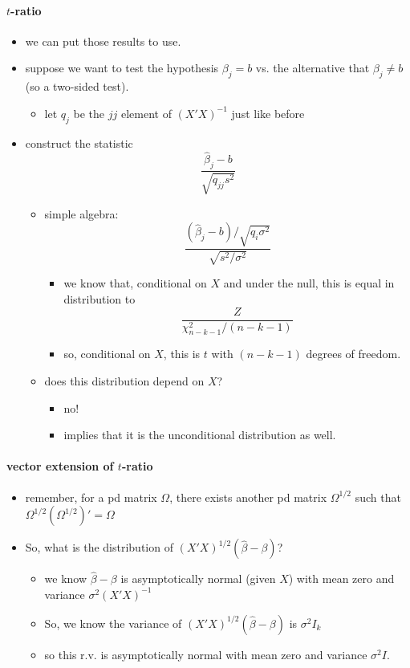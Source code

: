 \paragraph{$t$-ratio}
\begin{itemize}
\item we can put those results to use.
\item suppose we want to test the hypothesis $\beta_j = b$ vs. the
        alternative that $\beta_j \neq b$ (so a two-sided test).
\begin{itemize}
\item let $q_j$ be the $jj$ element of $(X'X)^{-1}$ just like before
\end{itemize}
\item construct the statistic
        \[ \frac{\hat\beta_j - b}{\sqrt{q_{jj} s^2}} \]
\begin{itemize}
\item simple algebra:
          \[ \frac{(\hat\beta_j - b)/\sqrt{q_i \sigma^2}}{\sqrt{s^2/\sigma^2}} \]
\begin{itemize}
\item we know that, conditional on $X$ and under the null, this is
            equal in distribution to
            \[ \frac{Z}{\chi^2_{n-k-1} / (n-k-1)} \]
\item so, conditional on $X$, this is $t$ with $(n-k-1)$ degrees
            of freedom.
\end{itemize}
\item does this distribution depend on $X$?
\begin{itemize}
\item no!
\item implies that it is the unconditional distribution as well.
\end{itemize}
\end{itemize}
\end{itemize}

\paragraph{vector extension of $t$-ratio}
\begin{itemize}
\item remember, for a pd matrix $\Omega$, there exists another pd
        matrix $\Omega^{1/2}$ such that $\Omega^{1/2}(\Omega^{1/2})' =
        \Omega$
\item So, what is the distribution of $(X'X)^{1/2}(\hat\beta - \beta)$?
\begin{itemize}
\item we know $\hat\beta - \beta$ is asymptotically normal (given
          $X$) with mean zero and variance $\sigma^2 (X'X)^{-1}$
\item So, we know the variance of $(X'X)^{1/2}(\hat\beta - \beta)$
          is $\sigma^2 I_k$
\item so this r.v. is asymptotically normal with mean zero and
          variance $\sigma^2 I$.
\end{itemize}
\end{itemize}

